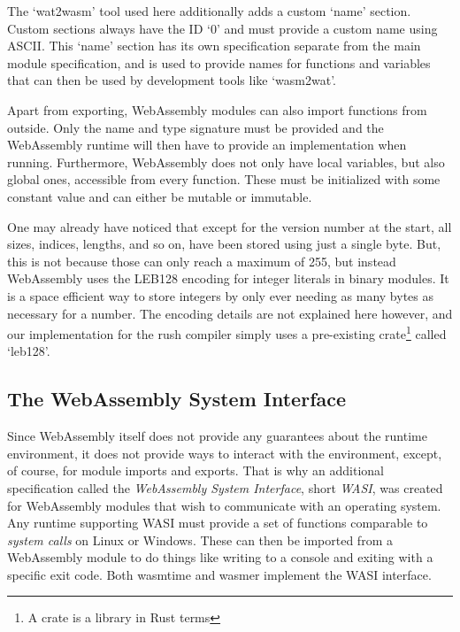 The `wat2wasm' tool used here additionally adds a custom `name' section.
Custom sections always have the ID `0' and must provide a custom name using ASCII.
This `name' section has its own specification separate from the main module specification, and is used to provide names for functions and variables that can then be used by development tools like `wasm2wat'.

Apart from exporting, WebAssembly modules can also import functions from outside.
Only the name and type signature must be provided and the WebAssembly runtime will then have to provide an implementation when running.
Furthermore, WebAssembly does not only have local variables, but also global ones, accessible from every function.
These must be initialized with some constant value and can either be mutable or immutable.

One may already have noticed that except for the version number at the start, all sizes, indices, lengths, and so on, have been stored using just a single byte.
But, this is not because those can only reach a maximum of 255, but instead WebAssembly uses the LEB128 encoding for integer literals in binary modules.
It is a space efficient way to store integers by only ever needing as many bytes as necessary for a number.
The encoding details are not explained here however, and our implementation for the rush compiler simply uses a pre-existing crate\footnote{A crate is a library in Rust terms} called `leb128'.


\subsection{The WebAssembly System Interface}

Since WebAssembly itself does not provide any guarantees about the runtime environment, it does not provide ways to interact with the environment, except, of course, for module imports and exports.
That is why an additional specification called the \emph{WebAssembly System Interface}, short \emph{WASI}, was created for WebAssembly modules that wish to communicate with an operating system.
Any runtime supporting WASI must provide a set of functions comparable to \emph{system calls} on Linux or Windows.
These can then be imported from a WebAssembly module to do things like writing to a console and exiting with a specific exit code.
Both wasmtime and wasmer implement the WASI interface.


